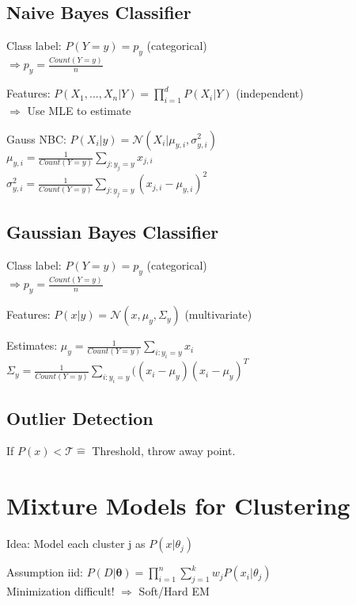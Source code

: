 \documentclass[a4paper, 11pt, landscape]{article}
\begin{document}
\begin{multicols*}{3}
		\subsection{Naive Bayes Classifier}
		\begin{compactdesc}
			\item[Class label:] $P(Y=y) = p_y$ (categorical)\\
			$\Rightarrow p_y = \frac{Count(Y=y)}{n}$
			\item[Features:] $P(X_1, ... ,X_n|Y) = \prod_{i=1}^{d}P(X_i|Y)$ (independent)\\
			$\Rightarrow$ Use MLE to estimate
			\item[Gauss NBC:] $P(X_i|y) = \mathcal{N}(X_i | \mu_{y,i}, \sigma_{y,i}^2)$\\
			$\mu_{y,i} = \frac{1}{Count(Y=y)} \sum_{j:y_j=y}x_{j,i}$\\
			$\sigma_{y,i}^2=\frac{1}{Count(Y=y)} \sum_{j:y_j=y}^{}(x_{j,i} - \mu_{y,i})^2$
		\end{compactdesc}
		\subsection{Gaussian Bayes Classifier}
		\begin{compactdesc}
			\item[Class label:]  $P(Y=y) = p_y$ (categorical)\\
			$\Rightarrow p_y = \frac{Count(Y=y)}{n}$
			\item[Features:] $P(x|y) = \mathcal{N}(x, \mu_y, \Sigma_y)$ (multivariate)
			\item[Estimates:] $\mu_y = \frac{1}{Count(Y=y)}\sum_{i:y_i=y}x_i$\\
			$\Sigma_y = \frac{1}{Count(Y=y)} \sum_{i:y_i=y}((x_i - \mu_y)(x_i - \mu_y)^T$
		\end{compactdesc}
		\subsection{Outlier Detection}
		If $P(x) < \mathcal{T} \hat{=}$ Threshold, throw away point.
		\section{Mixture Models for Clustering}
		\begin{compactdesc}
			\item[Idea:] Model each cluster j as $P(x|\theta_j)$
			\item[Assumption iid:] $P(D|\mathbf{\theta}) = \prod_{i=1}^{n}\sum_{j=1}^{k}{w_jP(x_i|\theta_j)}$\\
			Minimization difficult! $\Rightarrow$ Soft/Hard EM
		\end{compactdesc}

\end{multicols*}
\end{document}
